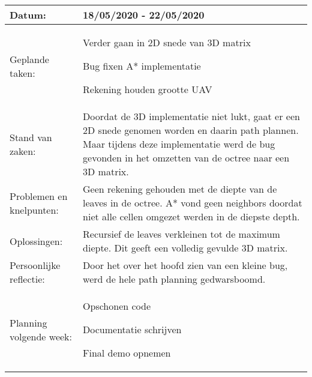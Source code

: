 \begin{tabularx}{\textwidth}{| l | X |}
  \hline
  Datum: & 18/05/2020 - 22/05/2020\\
  \hline
  Geplande taken: &
  \begin{compactitem}
    \item Verder gaan in 2D snede van 3D matrix
    \item Bug fixen A* implementatie
    \item Rekening houden grootte UAV
  \end{compactitem}\\
  \hline
  Stand van zaken: & Doordat de 3D implementatie niet lukt, gaat er een 2D snede genomen worden en daarin path plannen. Maar tijdens deze implementatie werd de bug gevonden in het omzetten van de octree naar een 3D matrix.\\
  \hline
  Problemen en knelpunten: & Geen rekening gehouden met de diepte van de leaves in de octree. A* vond geen neighbors doordat niet alle cellen omgezet werden in de diepste depth.\\
  \hline
  Oplossingen: & Recursief de leaves verkleinen tot de maximum diepte. Dit geeft een volledig gevulde 3D matrix.\\
  \hline
  Persoonlijke reflectie: & Door het over het hoofd zien van een kleine bug, werd de hele path planning gedwarsboomd.\\
  \hline
  Planning volgende week: &
  \begin{compactitem}
    \item Opschonen code
    \item Documentatie schrijven
    \item Final demo opnemen
  \end{compactitem}\\
  \hline
\end{tabularx}